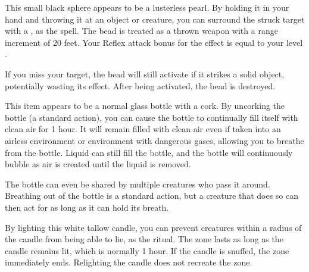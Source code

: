 
             This small black sphere appears to be a lusterless pearl.
            By holding it in your hand and throwing it at an object or creature, you can surround the struck target with a , as the spell.
            The bead is treated as a thrown weapon with a range increment of 20 feet.
            Your Reflex attack bonus for the  effect is equal to your level .

            If you miss your target, the bead will still activate if it strikes a solid object, potentially wasting its effect.
            After being activated, the bead is destroyed.


             This item appears to be a normal glass bottle with a cork.
            By uncorking the bottle (a standard action), you can cause the bottle to continually fill itself with clean air for 1 hour.
            It will remain filled with clean air even if taken into an airless environment or environment with dangerous gases, allowing you to breathe from the bottle.
            Liquid can still fill the bottle, and the bottle will continuously bubble as air is created until the liquid is removed.

            The bottle can even be shared by multiple creatures who pass it around.
            Breathing out of the bottle is a standard action, but a creature that does so can then act for as long as it can hold its breath.


             By lighting this white tallow candle, you can prevent creatures within a \areamed radius of the candle from being able to lie, as the  ritual.
            The zone lasts as long as the candle remains lit, which is normally 1 hour.
            If the candle is snuffed, the zone immediately ends.
            Relighting the candle does not recreate the zone.

